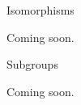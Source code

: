 
\begin{section}{Isomorphisms}


Coming soon.

\end{section}


\begin{section}{Subgroups}


Coming soon.

%
%

\end{section}


%
%
%

